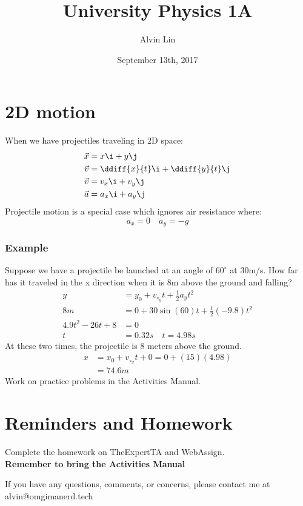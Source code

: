 \documentclass[letterpaper, 12pt]{math}
\title{University Physics 1A}
\author{Alvin Lin}
\date{September 13th, 2017}
\begin{document}
\maketitle

\section*{2D motion}
When we have projectiles traveling in 2D space:
\begin{align*}
  \vec{x} &= x\i+y\j \\
  \vec{v} &= \ddiff{x}{t}\i+\ddiff{y}{t}\j \\
  \vec{v} &= v_x\i+v_y\j \\
  \vec{a} &= a_x\i+a_y\j
\end{align*}
Projectile motion is a special case which ignores air resistance where:
\[ a_x = 0 \quad a_y = -g \]

\subsubsection*{Example}
Suppose we have a projectile be launched at an angle of \( 60^{\circ} \) at
30m/s. How far has it traveled in the x direction when it is 8m above the
ground and falling?
\begin{align*}
  y &= y_0+v_{\circ_y}t+\frac{1}{2}a_yt^2 \\
  8m &= 0+30\sin(60)t+\frac{1}{2}(-9.8)t^2 \\
  4.9t^2-26t+8 &= 0 \\
  t &= 0.32s \quad t = 4.98s
\end{align*}
At these two times, the projectile is 8 meters above the ground.
\begin{align*}
  x &= x_0+v_{\circ_x}t+0 = 0+(15)(4.98) \\
  &= 74.6m
\end{align*}
Work on practice problems in the Activities Manual.

\section*{Reminders and Homework}
Complete the homework on TheExpertTA and WebAssign. \\
\textbf{Remember to bring the Activities Manual}

\begin{center}
  If you have any questions, comments, or concerns, please contact me at
  alvin@omgimanerd.tech
\end{center}
\end{document}
